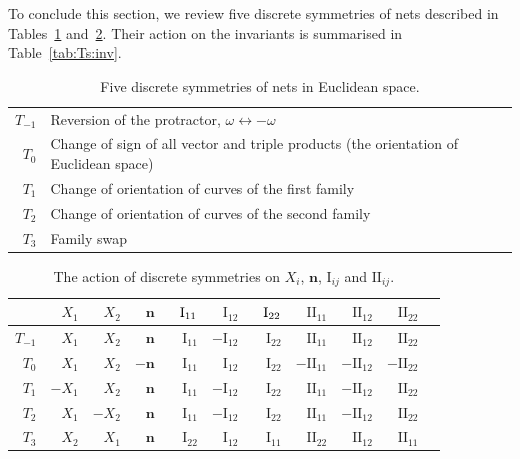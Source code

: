 \documentclass[pdftex]{sigma}
\let\ve\mathbf
\def\I#1#2{\mathrm{I}_{#1#2}}
\def\II#1#2{\mathrm{II}_{#1#2}}
\def\1{{-1}}
\numberwithin{equation}{section}
\begin{document}
To conclude this section, we review five discrete symmetries of nets
described in Tables~\ref{tab:Ts} and~\ref{tab:Ts:XnFF}.
Their action on the invariants is summarised in Table~\ref{tab:Ts:inv}.

\begin{table}[th]\centering\renewcommand{\arraystretch}{1.2}
\begin{tabular}{r|l}
$T_{-1}$ & Reversion of the protractor, $\omega \longleftrightarrow -\omega$ \\
$T_0$ & Change of sign of all vector and triple products
   (the orientation of Euclidean space) \\
$T_1$ & Change of orientation of curves of the first family \\
$T_2$ & Change of orientation of curves of the second family \\
$T_3$ & Family swap
\end{tabular}
\caption{Five discrete symmetries of nets in Euclidean space.}
\label{tab:Ts}
\end{table}

\begin{table}[th]\centering\renewcommand{\arraystretch}{1.2}
\begin{tabular}{r|rrrrrrrrrr}
     &  $X_1$ &  $X_2$ & $\ve n$ &$\hphantom{-}\I11$ &  $\I12$ &$\hphantom{-}\I22$ &  $\II11$ &  $\II12$ &  $\II22$ \\
     \hline
$T_\1$ &  $X_1$ &  $X_2$ &  $\ve n$ &  $\I11$ & $-\I12$ &  $\I22$ &  $\II11$ &  $\II12$ &  $\II22$ \\
 $T_0$ &  $X_1$ &  $X_2$ & $-\ve n$ &  $\I11$ &  $\I12$ &  $\I22$ & $-\II11$ & $-\II12$ & $-\II22$ \\
 $T_1$ & $-X_1$ &  $X_2$ &  $\ve n$ &  $\I11$ & $-\I12$ &  $\I22$ &  $\II11$ & $-\II12$ &  $\II22$ \\
 $T_2$ &  $X_1$ & $-X_2$ &  $\ve n$ &  $\I11$ & $-\I12$ &  $\I22$ &  $\II11$ & $-\II12$ &  $\II22$ \\
 $T_3$ &  $X_2$ &  $X_1$ &  $\ve n$ &  $\I22$ &  $\I12$ &  $\I11$ &  $\II22$ &  $\II12$ &  $\II11$
\end{tabular}

\caption{The action of discrete symmetries on $X_i$, $\ve n$, $\I ij$ and $\II ij$.}\label{tab:Ts:XnFF}
\end{table}
\end{document}
